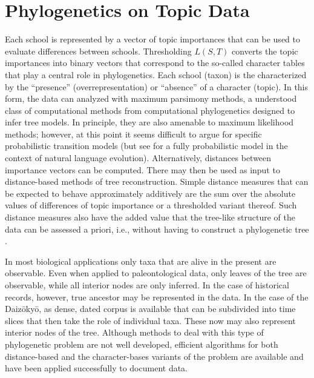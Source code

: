 \documentclass[a4paper,10pt]{article}
\newcommand{\TODO}[1]{\begingroup\color{red}#1\endgroup}
\begin{document}
{\section{Phylogenetics on Topic Data} 

Each \TODO{school} is represented by a vector of topic importances that can
be used to evaluate differences between \TODO{schools}.  Thresholding
$L(S,T)$ converts the topic importances into binary vectors that correspond
to the so-called character tables that play a central role in
phylogenetics. Each \TODO{school} (taxon) is the characterized by the
``presence'' (overrepresentation) or ``absence'' of a character (topic).
In this form, the data can analyzed with maximum parsimony methods, a
understood class of computational methods from computational phylogenetics
designed to infer tree models. In principle, they are also amenable to
maximum likelihood methods; however, at this point it seems difficult to
argue for specific probabilistic transition models (but see
\cite{Hruschka:15} for a fully probabilistic model in the context of
natural language evolution). Alternatively, distances between importance
vectors can be computed. There may then be used as input to distance-based
methods of tree reconstruction. Simple distance measures that can be
expected to behave approximately additively are the sum over the absolute
values of differences of topic importance or a thresholded variant
thereof. Such distance measures also have the added value that the
tree-like structure of the data can be assessed a priori, i.e., without
having to construct a phylogenetic tree \cite{Misof:14}.

In most biological applications only taxa that are alive in the present are
observable. Even when applied to paleontological data, only leaves of the
tree are observable, while all interior nodes are only inferred. In the
case of historical records, however, true ancestor may be represented in
the data. In the case of the Daiz{\=o}ky{\=o}, as dense, dated corpus is
available that can be subdivided into time slices that then take the role
of individual taxa. These now may also represent interior nodes of the
tree. Although methods to deal with this type of phylogenetic problem are
not well developed, efficient algorithms for both distance-based and the
character-bases variants of the problem are available \cite{Telles:13} and
have been applied successfully to document data. 














}
\end{document}
